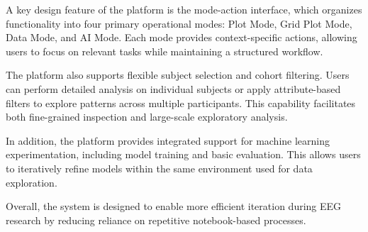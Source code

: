 A key design feature of the platform is the mode-action interface, which organizes functionality into four primary operational modes: Plot Mode, Grid Plot Mode, Data Mode, and AI Mode. Each mode provides context-specific actions, allowing users to focus on relevant tasks while maintaining a structured workflow.
\vspace{0.5em}

The platform also supports flexible subject selection and cohort filtering. Users can perform detailed analysis on individual subjects or apply attribute-based filters to explore patterns across multiple participants. This capability facilitates both fine-grained inspection and large-scale exploratory analysis.
\vspace{0.5em}

In addition, the platform provides integrated support for machine learning experimentation, including model training and basic evaluation. This allows users to iteratively refine models within the same environment used for data exploration.
\vspace{0.5em}

Overall, the system is designed to enable more efficient iteration during EEG research by reducing reliance on repetitive notebook-based processes.




